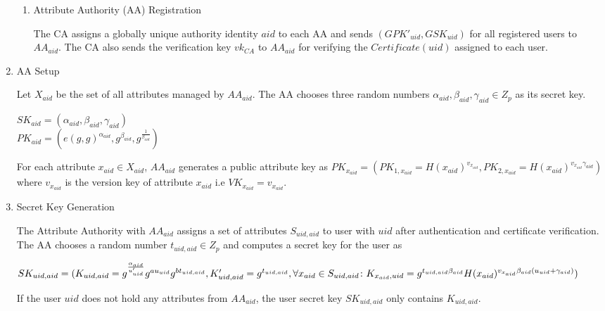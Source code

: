 \begin{enumerate}
\begin{enumerate}
		\item Attribute Authority (AA) Registration
		
		The CA assigns a globally unique authority identity $ aid $ to each AA and sends $ (GPK'_{uid}, GSK_{uid}) $ for all registered users to $ AA_{aid} $. The CA also sends the verification key $ vk_{CA} $ to $ AA_{aid} $ for verifying the $ Certificate(uid) $ assigned to each user.
		
	\end{enumerate}
	
	\item AA Setup
	
	Let $ X_{aid} $ be the set of all attributes managed by $ AA_{aid} $. The AA chooses three random numbers $ \alpha_{aid}, \beta_{aid}, \gamma_{aid} \in Z_{p} $ as its secret key.
	
	\begin{center}
		\begin{minipage}{0.5\linewidth}
			$ SK_{aid} = (\alpha_{aid}, \beta_{aid}, \gamma_{aid}) $ \\
			$ PK_{aid} = (e(g, g)^{\alpha_{aid}}, g^{\beta_{aid}}, g^{\frac{1}{\beta_{aid}}}) $
		\end{minipage}
	\end{center}
	
	For each attribute $ x_{aid} \in X_{aid} $, $ AA_{aid} $ generates a public attribute key as $ PK_{x_{aid}} = (PK_{1, x_{aid}} = H(x_{aid})^{v_{x_{aid}}}, PK_{2, x_{aid}} = H(x_{aid})^{v_{x_{aid}}\gamma_{aid}}) $ where $ v_{x_{aid}} $ is the version key of attribute $ x_{aid} $ i.e $ VK_{x_{aid}} = v_{x_{aid}} $.
	
	\item Secret Key Generation
	
	The Attribute Authority with $ AA_{aid} $ assigns a set of attributes $ S_{uid,aid} $ to user with $ uid $ after authentication and certificate verification. The AA chooses a random number $ t_{uid,aid} \in Z_{p} $ and computes a secret key for the user as
	
	$ SK_{uid,aid} = (K_{uid,aid} = g^{\frac{\alpha_{aid}}{u'_{uid}}}g^{au_{uid}}g^{bt_{uid,aid}}, K'_{uid,aid} = g^{t_{uid,aid}}, \\
	\forall x_{aid} \in S_{uid,aid} \colon K_{x_{aid},uid} = g^{t_{uid,aid}\beta_{aid}}H(x_{aid})^{v_{x_{aid}}\beta_{aid}(u_{uid} + \gamma_{aid})}) $
	
	If the user $ uid $ does not hold any attributes from $ AA_{aid} $, the user secret key $ SK_{uid,aid} $ only contains $ K_{uid,aid} $.
	

\end{enumerate}
